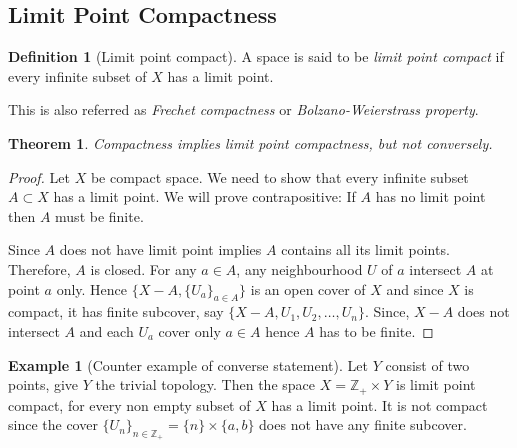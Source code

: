 \documentclass[12pt,reqno]{amsart}
\theoremstyle{plain}
\newtheorem{thm}{Theorem}
\theoremstyle{definition}
\newtheorem{defn}{Definition}
\newtheorem{eg}{Example}
\newcommand{\bb}[1]{\mathbb{#1}}
\begin{document}



\subsection{Limit Point Compactness}
\begin{defn}[Limit point compact]
    A space is said to be {\it limit point compact} if every infinite subset of $X$ has a limit point.

    This is also referred as {\it Frechet compactness} or {\it Bolzano-Weierstrass property}.
\end{defn}
\begin{thm} \label{23}
    Compactness implies limit point compactness, but not conversely.
\end{thm}
\begin{proof}
    Let $X$ be compact space. We need to show that every infinite subset $A \subset X$ has a limit point. We will prove contrapositive: If $A$ has no limit point then $A$ must be finite.
    
    Since $A$ does not have limit point implies $A$ contains all its limit points. Therefore, $A$ is closed. For any $a \in A$, any neighbourhood $U$ of $a$ intersect $A$ at point $a$ only. Hence $\{X - A, \{U_a\}_{a\in A}\}$ is an open cover of $X$ and since $X$ is compact, it has finite subcover, say $\{X - A, U_1, U_2, \dots, U_n\}$. Since, $X - A$ does not intersect $A$ and each $U_a$ cover only $a \in A$ hence $A$ has to be finite. 
\end{proof}
\begin{eg}[Counter example of converse statement]
    Let $Y$ consist of two points, give $Y$ the trivial topology. Then the space $ X = \bb Z_+ \times Y$ is limit point compact, for every non empty subset of $X$ has a limit point. It is not compact since the cover $\{U_n\}_{n \in \bb Z_+} = \{n\} \times \{a,b\}$ does not have any finite subcover.
\end{eg}
\end{document}
